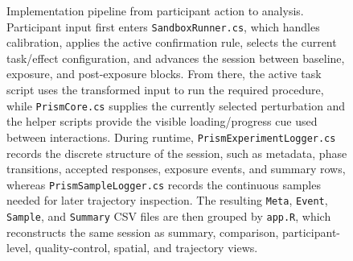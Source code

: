 \begin{figure}[H]
{}
    \caption{Implementation pipeline from participant action to analysis. Participant input first enters \texttt{SandboxRunner.cs}, which handles calibration, applies the active confirmation rule, selects the current task/effect configuration, and advances the session between baseline, exposure, and post-exposure blocks. From there, the active task script uses the transformed input to run the required procedure, while \texttt{PrismCore.cs} supplies the currently selected perturbation and the helper scripts provide the visible loading/progress cue used between interactions. During runtime, \texttt{PrismExperimentLogger.cs} records the discrete structure of the session, such as metadata, phase transitions, accepted responses, exposure events, and summary rows, whereas \texttt{PrismSampleLogger.cs} records the continuous samples needed for later trajectory inspection. The resulting \texttt{Meta}, \texttt{Event}, \texttt{Sample}, and \texttt{Summary} CSV files are then grouped by \texttt{app.R}, which reconstructs the same session as summary, comparison, participant-level, quality-control, spatial, and trajectory views.}
    \label{fig:implementation-pipeline}
\end{figure}

